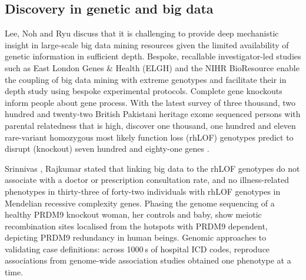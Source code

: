 \documentclass[sigconf]{acmart}
\begin{document}
\subsection{Discovery in genetic and big data}
Lee, Noh and Ryu \cite{lee2011ire1} discuss that it is challenging to provide deep mechanistic insight in large-scale big data mining resources given the limited availability of genetic information in sufficient depth. Bespoke, recallable investigator-led studies such as East London Genes & Health (ELGH) and the NIHR BioResource enable the coupling of big data mining with extreme genotypes and facilitate their in depth study using bespoke experimental protocols. Complete gene knockouts inform people about gene process. With the latest survey of three thousand, two hundred and twenty-two  British Pakistani heritage exome sequenced persons with parental relatedness that is high, discover one thousand, one hundred and eleven rare-variant homozygous most likely function loss (rhLOF) genotypes predict to disrupt (knockout) seven hundred and eighty-one genes \cite{wang2005framingham}.
\par Srinnivas \cite{srinivas2010analysis}, Rajkumar \cite{rajkumar2010diagnosis} stated that linking big data to the rhLOF genotypes do not associate with a doctor or prescription consultation rate, and no illness-related phenotypes in thirty-three of forty-two individuals with rhLOF genotypes in Mendelian recessive complexity genes. Phasing the genome sequencing of a healthy PRDM9 knockout woman, her controls and baby, show meiotic recombination sites localised from the hotspots with PRDM9 dependent, depicting PRDM9 redundancy in human beings. Genomic approaches to validating case definitions: across 1000 s of hospital ICD codes, reproduce associations from genome-wide association studies obtained one phenotype at a time.
\end{document}
